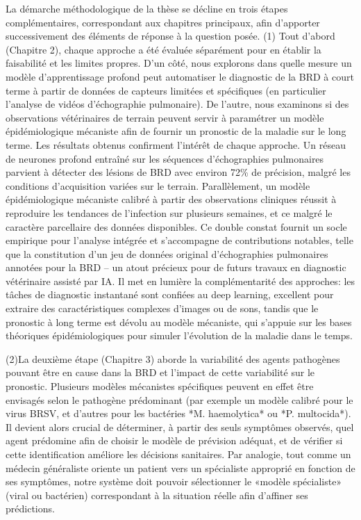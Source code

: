 La démarche méthodologique de la thèse se décline en trois étapes complémentaires, correspondant aux chapitres principaux, afin d’apporter successivement des éléments de réponse à la question posée. (1) Tout d’abord (Chapitre 2), chaque approche a été évaluée séparément pour en établir la faisabilité et les limites propres. D’un côté, nous explorons dans quelle mesure un modèle d’apprentissage profond peut automatiser le diagnostic de la BRD à court terme à partir de données de capteurs limitées et spécifiques (en particulier l’analyse de vidéos d’échographie pulmonaire). De l’autre, nous examinons si des observations vétérinaires de terrain peuvent servir à paramétrer un modèle épidémiologique mécaniste afin de fournir un pronostic de la maladie sur le long terme. Les résultats obtenus confirment l’intérêt de chaque approche. Un réseau de neurones profond entraîné sur les séquences d’échographies pulmonaires parvient à détecter des lésions de BRD avec environ 72\% de précision, malgré les conditions d’acquisition variées sur le terrain. Parallèlement, un modèle épidémiologique mécaniste calibré à partir des observations cliniques réussit à reproduire les tendances de l’infection sur plusieurs semaines, et ce malgré le caractère parcellaire des données disponibles. Ce double constat fournit un socle empirique pour l’analyse intégrée et s’accompagne de contributions notables, telle que la constitution d’un jeu de données original d’échographies pulmonaires annotées pour la BRD – un atout précieux pour de futurs travaux en diagnostic vétérinaire assisté par IA. Il met en lumière la complémentarité des approches: les tâches de diagnostic instantané sont confiées au deep learning, excellent pour extraire des caractéristiques complexes d’images ou de sons, tandis que le pronostic à long terme est dévolu au modèle mécaniste, qui s’appuie sur les bases théoriques épidémiologiques pour simuler l’évolution de la maladie dans le temps.

(2)La deuxième étape (Chapitre 3) aborde la variabilité des agents pathogènes pouvant être en cause dans la BRD et l’impact de cette variabilité sur le pronostic. Plusieurs modèles mécanistes spécifiques peuvent en effet être envisagés selon le pathogène prédominant (par exemple un modèle calibré pour le virus BRSV, et d’autres pour les bactéries *M. haemolytica* ou *P. multocida*). Il devient alors crucial de déterminer, à partir des seuls symptômes observés, quel agent prédomine afin de choisir le modèle de prévision adéquat, et de vérifier si cette identification améliore les décisions sanitaires. Par analogie, tout comme un médecin généraliste oriente un patient vers un spécialiste approprié en fonction de ses symptômes, notre système doit pouvoir sélectionner le «modèle spécialiste» (viral ou bactérien) correspondant à la situation réelle afin d’affiner ses prédictions. 

